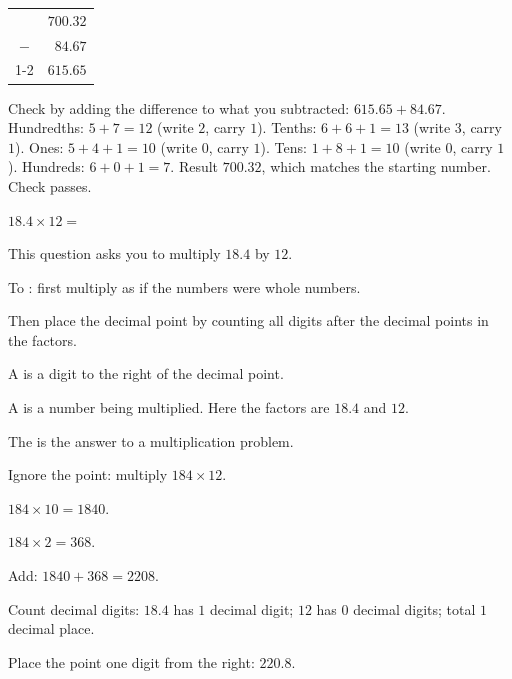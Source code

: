 \begin{center}
{\setlength{\tabcolsep}{0.15em}%
\begin{tabular}{cr}
      & $700.32$ \\
  $-$ & $84.67$  \\ \cline{1-2}
      & $615.65$ \\
\end{tabular}}
\end{center}


\noindent Check by adding the difference to what you subtracted:
$615.65 + 84.67$. Hundredths: $5 + 7 = 12$ (write $2$, carry $1$).
Tenths: $6 + 6 + 1 = 13$ (write $3$, carry $1$).
Ones: $5 + 4 + 1 = 10$ (write $0$, carry $1$).
Tens: $1 + 8 + 1 = 10$ (write $0$, carry $1$).
Hundreds: $6 + 0 + 1 = 7$. Result $700.32$, which matches the starting number.
Check passes.


\noindent $18.4 \times 12 = $\ansblank{}


\noindent This question asks you to multiply $18.4$ by $12$.

\begin{words}
  \item To \unskip: first multiply as if the numbers were
        whole numbers.
  \item Then place the decimal point by counting all digits after the decimal
        points in the factors.
  \item A is a digit to the right of the decimal point.
  \item A is a number being multiplied. Here the factors are $18.4$
        and $12$.
  \item The is the answer to a multiplication problem.
\end{words}

\begin{steps}
  \item Ignore the point: multiply $184 \times 12$.
  \item $184 \times 10 = 1840$.
  \item $184 \times 2 = 368$.
  \item Add: $1840 + 368 = 2208$.
  \item Count decimal digits: $18.4$ has $1$ decimal digit; $12$ has $0$ decimal
        digits; total $1$ decimal place.
  \item Place the point one digit from the right: $220.8$.
\end{steps}

